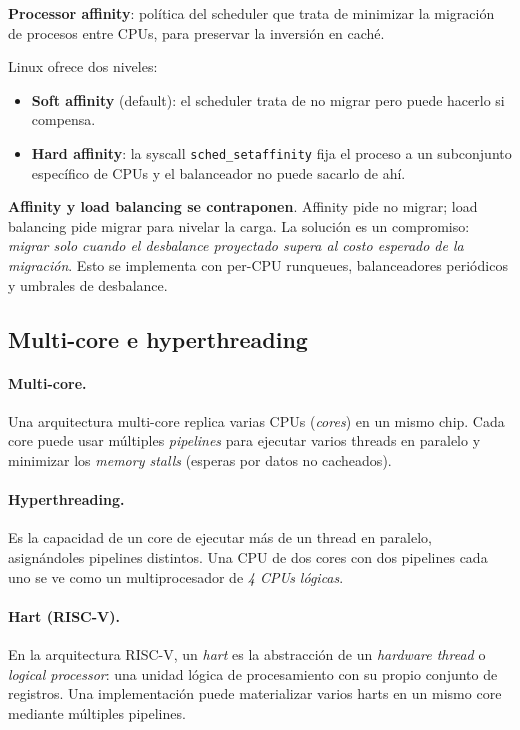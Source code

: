 \documentclass[11pt,a4paper]{article}
\begin{document}
\begin{definicion}
\textbf{Processor affinity}: política del scheduler que trata de
minimizar la migración de procesos entre CPUs, para preservar la
inversión en caché.
\end{definicion}

Linux ofrece dos niveles:
\begin{itemize}[leftmargin=*,nosep]
    \item \textbf{Soft affinity} (default): el scheduler trata de no
        migrar pero puede hacerlo si compensa.
    \item \textbf{Hard affinity}: la syscall
        \texttt{sched\_setaffinity} fija el proceso a un subconjunto
        específico de CPUs y el balanceador no puede sacarlo de ahí.
\end{itemize}

\begin{importante}
\textbf{Affinity y load balancing se contraponen}. Affinity pide no
migrar; load balancing pide migrar para nivelar la carga. La
solución es un compromiso: \emph{migrar solo cuando el desbalance
proyectado supera al costo esperado de la migración}. Esto se
implementa con per-CPU runqueues, balanceadores periódicos y
umbrales de desbalance.
\end{importante}

\subsection{Multi-core e hyperthreading}

\paragraph{Multi-core.} Una arquitectura multi-core replica varias
CPUs (\emph{cores}) en un mismo chip. Cada core puede usar múltiples
\emph{pipelines} para ejecutar varios threads en paralelo y
minimizar los \emph{memory stalls} (esperas por datos no cacheados).

\paragraph{Hyperthreading.} Es la capacidad de un core de ejecutar
más de un thread en paralelo, asignándoles pipelines distintos. Una
CPU de dos cores con dos pipelines cada uno se ve como un
multiprocesador de \emph{4 CPUs lógicas}.

\paragraph{Hart (RISC-V).} En la arquitectura RISC-V, un \emph{hart}
es la abstracción de un \emph{hardware thread} o \emph{logical
processor}: una unidad lógica de procesamiento con su propio conjunto
de registros. Una implementación puede materializar varios harts en
un mismo core mediante múltiples pipelines.
\end{document}
